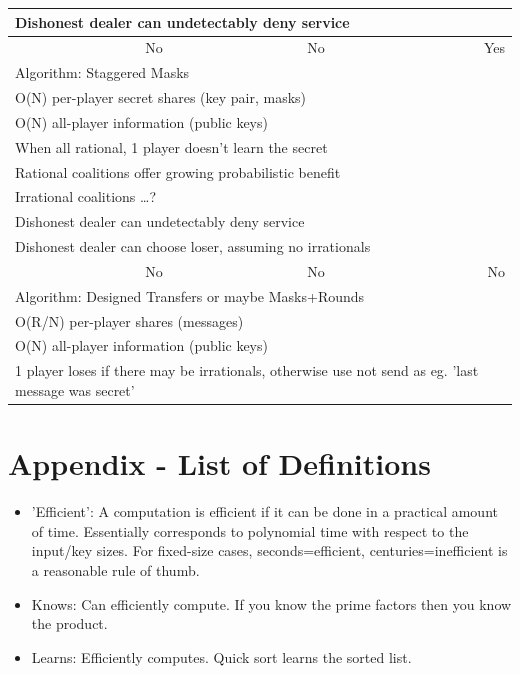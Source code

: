 \documentclass{dalcsthesis}
\begin{document}
\begin{tabular}{|r|r|r|}
\multicolumn{3}{|l|}{Dishonest dealer can undetectably deny service}\\
\hline
No	& No	& Yes	\\
\multicolumn{3}{|l|}{Algorithm: Staggered Masks}\\
\multicolumn{3}{|l|}{O(N) per-player secret shares (key pair, masks)}\\
\multicolumn{3}{|l|}{O(N) all-player information (public keys)}\\
\multicolumn{3}{|l|}{When all rational, 1 player doesn't learn the secret}\\
\multicolumn{3}{|l|}{Rational coalitions offer growing probabilistic benefit}\\
\multicolumn{3}{|l|}{Irrational coalitions \ldots ?}\\
\multicolumn{3}{|l|}{Dishonest dealer can undetectably deny service}\\
\multicolumn{3}{|l|}{Dishonest dealer can choose loser, assuming no irrationals}\\
\hline
No	& No	& No	\\
\multicolumn{3}{|l|}{Algorithm: Designed Transfers or maybe Masks+Rounds}\\
\multicolumn{3}{|l|}{O(R/N) per-player shares (messages)}\\
\multicolumn{3}{|l|}{O(N) all-player information (public keys)}\\
\multicolumn{3}{|l|}{1 player loses if there may be irrationals, otherwise use not send as eg. 'last message was secret'}\\
\hline
\end{tabular}

\chapter{Appendix - List of Definitions}

\begin{itemize}
  \item 'Efficient': A computation is efficient if it can be done in a practical amount of time. Essentially corresponds to polynomial time with respect to the input/key sizes. For fixed-size cases, seconds=efficient, centuries=inefficient is a reasonable rule of thumb.
  \item Knows: Can efficiently compute. If you know the prime factors then you know the product.
  \item Learns: Efficiently computes. Quick sort learns the sorted list.
\end{itemize}
\end{document}
